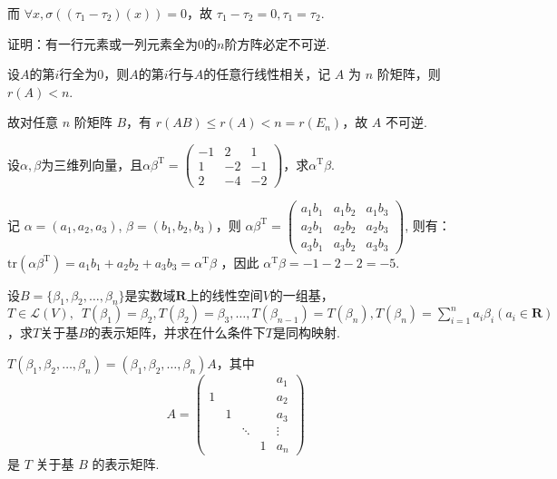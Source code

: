 \begin{exercise}
\begin{exgroup}
\begin{answer}
            而 $\forall x, \sigma((\tau_1-\tau_2)(x))=0$，故 $\tau_1-\tau_2=0, \tau_1=\tau_2$.
        \end{answer}

        \item 证明：有一行元素或一列元素全为0的$n$阶方阵必定不可逆.
        \begin{answer}
            设$A$的第$i$行全为0，则$A$的第$i$行与$A$的任意行线性相关，记 $A$ 为 $n$ 阶矩阵，则$r(A) < n$.

            故对任意 $n$ 阶矩阵 $B$，有 $r(AB) \leq r(A) < n = r(E_n)$，故 $A$ 不可逆.
        \end{answer}

        \item 设$\alpha,\beta$为三维列向量，且$\alpha\beta^\mathrm{T}=\begin{pmatrix}
                -1 & 2  & 1  \\
                1  & -2 & -1 \\
                2  & -4 & -2
            \end{pmatrix}$，求$\alpha^\mathrm{T}\beta$.
        \begin{answer}
            记 $\alpha = (a_1,a_2,a_3)$, $\beta = (b_1,b_2,b_3)$，则 $\alpha\beta^\mathrm{T} = \begin{pmatrix}
                    a_1b_1 & a_1b_2 & a_1b_3 \\
                    a_2b_1 & a_2b_2 & a_2b_3 \\
                    a_3b_1 & a_3b_2 & a_3b_3
                \end{pmatrix}$,
            则有：$\text{tr}(\alpha\beta^\mathrm{T}) = a_1b_1+a_2b_2+a_3b_3 = \alpha^\mathrm{T}\beta$ ，因此 $\alpha^\mathrm{T}\beta = -1-2-2 = -5$.
        \end{answer}
    \end{exgroup}

    \begin{exgroup}
        \item 设$B=\{\beta_1,\beta_2,\ldots,\beta_n\}$是实数域$\mathbf{R}$上的线性空间$V$的一组基，$T \in \mathcal{L}(V),\enspace T(\beta_1)=\beta_2,T(\beta_2)=\beta_3,\ldots,T(\beta_{n-1})=T(\beta_n),T(\beta_n)=\displaystyle\sum_{i=1}^{n}a_i\beta_i(a_i \in \mathbf{R})$，求$T$关于基$B$的表示矩阵，并求在什么条件下$T$是同构映射.
        \begin{answer}
            $ T(\beta_1, \beta_2, \ldots, \beta_n) = (\beta_1, \beta_2, \ldots, \beta_n)A $，其中
            \[ A = \begin{pmatrix}
                      &   &        &   & a_1    \\
                    1 &   &        &   & a_2    \\
                      & 1 &        &   & a_3    \\
                      &   & \ddots &   & \vdots \\
                      &   &        & 1 & a_n
                \end{pmatrix} \]
            是 $ T $ 关于基 $ B $ 的表示矩阵.


\end{answer}
\end{exgroup}
\end{exercise}
